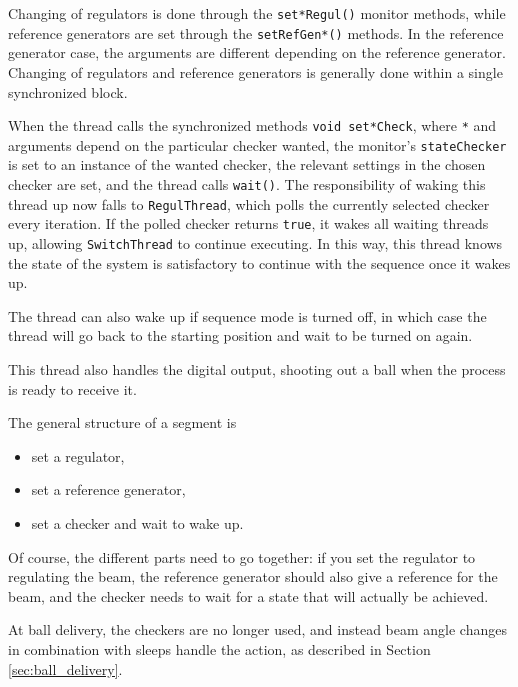 Changing of regulators is done through the \texttt{set*Regul()} monitor methods, while reference generators are set through the \texttt{setRefGen*()} methods. 
In the reference generator case, the arguments are different depending on the reference generator. 
Changing of regulators and reference generators is generally done within a single synchronized block.

When the thread calls the synchronized methods \texttt{void set*Check}, where \texttt{*} and arguments depend on the particular checker wanted, the monitor's \texttt{stateChecker} is set to an instance of the wanted checker, the relevant settings in the chosen checker are set, and the thread calls \texttt{wait()}. 
The responsibility of waking this thread up now falls to \texttt{RegulThread}, which polls the currently selected checker every iteration. 
If the polled checker returns \texttt{true}, it wakes all waiting threads up, allowing \texttt{SwitchThread} to continue executing. 
In this way, this thread knows the state of the system is satisfactory to continue with the sequence once it wakes up.

The thread can also wake up if sequence mode is turned off, in which case the thread will go back to the starting position and wait to be turned on again.

This thread also handles the digital output, shooting out a ball when the process is ready to receive it.

The general structure of a segment is
\begin{itemize}
\item set a regulator,
\item set a reference generator,
\item set a checker and wait to wake up.
\end{itemize}

Of course, the different parts need to go together: if you set the regulator to regulating the beam, 
the reference generator should also give a reference for the beam, 
and the checker needs to wait for a state that will actually be achieved.

At ball delivery, the checkers are no longer used, and instead beam angle changes in combination with sleeps handle the action, as described in Section \ref{sec:ball_delivery}.
